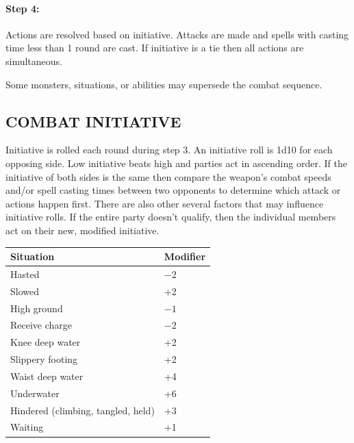 \begin{multicols}{2}
\paragraph{Step 4:} Actions are resolved based on initiative.  Attacks are made and spells with casting time less than 1 round are cast.  If initiative is a tie then all actions are simultaneous.

Some monsters, situations, or abilities may supersede the combat sequence.  

\subsection{COMBAT INITIATIVE}

Initiative is rolled each round during step 3.  An initiative roll is 1d10 for each opposing side.  Low initiative beats high and parties act in ascending order.  If the initiative of both sides is the same then compare the weapon's combat speeds and/or spell casting times between two opponents to determine which attack or actions happen first.  There are also other several factors that may influence initiative rolls.  If the entire party doesn't qualify, then the individual members act on their new, modified initiative.

\noindent
\begin{minipage}{\columnwidth}

\label{initmods}
\noindent
\begin{tabular}{|p{}|p{}|}
\hline
Situation	& Modifier \\
\hline\hline
\rowcolor[gray]{.9}Hasted	& $-2$ \\
Slowed	& +2 \\
\rowcolor[gray]{.9}High ground	& $-1$ \\
Receive charge	& $-2$ \\
\rowcolor[gray]{.9}Knee deep water	&  +2\\
Slippery footing	& +2 \\
\rowcolor[gray]{.9}Waist deep water	& +4 \\
Underwater	& +6 \\
\rowcolor[gray]{.9}Hindered (climbing, tangled, held)	& +3 \\
Waiting	& +1 \\
\hline
\end{tabular}

\end{minipage}


\end{multicols}
